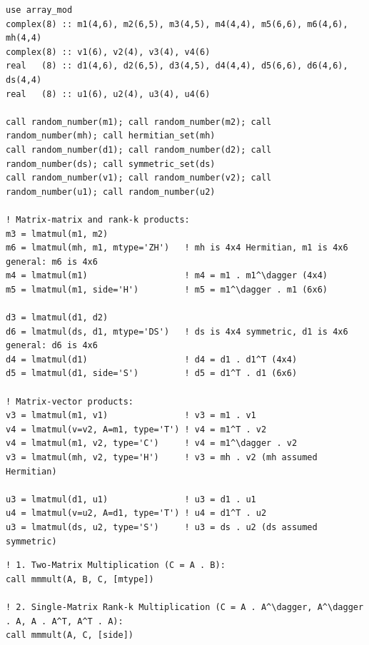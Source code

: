 \lstset{language=[95]Fortran}
\begin{lstlisting}
use array_mod
complex(8) :: m1(4,6), m2(6,5), m3(4,5), m4(4,4), m5(6,6), m6(4,6), mh(4,4)
complex(8) :: v1(6), v2(4), v3(4), v4(6)
real   (8) :: d1(4,6), d2(6,5), d3(4,5), d4(4,4), d5(6,6), d6(4,6), ds(4,4)
real   (8) :: u1(6), u2(4), u3(4), u4(6)

call random_number(m1); call random_number(m2); call random_number(mh); call hermitian_set(mh)
call random_number(d1); call random_number(d2); call random_number(ds); call symmetric_set(ds)
call random_number(v1); call random_number(v2); call random_number(u1); call random_number(u2)

! Matrix-matrix and rank-k products:
m3 = lmatmul(m1, m2)
m6 = lmatmul(mh, m1, mtype='ZH')   ! mh is 4x4 Hermitian, m1 is 4x6 general: m6 is 4x6
m4 = lmatmul(m1)                   ! m4 = m1 . m1^\dagger (4x4)
m5 = lmatmul(m1, side='H')         ! m5 = m1^\dagger . m1 (6x6)

d3 = lmatmul(d1, d2)
d6 = lmatmul(ds, d1, mtype='DS')   ! ds is 4x4 symmetric, d1 is 4x6 general: d6 is 4x6
d4 = lmatmul(d1)                   ! d4 = d1 . d1^T (4x4)
d5 = lmatmul(d1, side='S')         ! d5 = d1^T . d1 (6x6)

! Matrix-vector products:
v3 = lmatmul(m1, v1)               ! v3 = m1 . v1
v4 = lmatmul(v=v2, A=m1, type='T') ! v4 = m1^T . v2
v4 = lmatmul(m1, v2, type='C')     ! v4 = m1^\dagger . v2
v3 = lmatmul(mh, v2, type='H')     ! v3 = mh . v2 (mh assumed Hermitian)

u3 = lmatmul(d1, u1)               ! u3 = d1 . u1
u4 = lmatmul(v=u2, A=d1, type='T') ! u4 = d1^T . u2
u3 = lmatmul(ds, u2, type='S')     ! u3 = ds . u2 (ds assumed symmetric)
\end{lstlisting}


\lstset{language=[95]Fortran}
\begin{lstlisting}
! 1. Two-Matrix Multiplication (C = A . B):
call mmmult(A, B, C, [mtype])

! 2. Single-Matrix Rank-k Multiplication (C = A . A^\dagger, A^\dagger . A, A . A^T, A^T . A):
call mmmult(A, C, [side])
\end{lstlisting}

